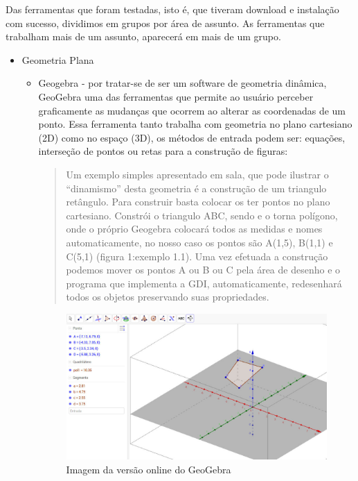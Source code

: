 \documentclass[12pt,a4paper]{article}
\begin{document}
Das ferramentas que foram testadas, isto é, que tiveram download e instalação com sucesso, dividimos em grupos por área de assunto. As ferramentas que trabalham mais de um assunto, aparecerá em mais de um grupo.
         \begin{itemize}
            \item Geometria Plana
            \begin{itemize}
                \item Geogebra - por tratar-se de ser um software de geometria dinâmica, GeoGebra uma das ferramentas que permite ao usuário perceber graficamente as mudanças que ocorrem ao alterar as coordenadas de um ponto. Essa ferramenta tanto trabalha com geometria no plano cartesiano (2D) como no espaço (3D), os métodos de entrada podem ser: equações, interseção de pontos ou retas para a construção de figuras:
                
\begin{quotation}
Um exemplo simples apresentado em sala, que pode ilustrar o “dinamismo” desta geometria é a construção de um triangulo retângulo. Para construir basta colocar os ter pontos no plano cartesiano. Constrói o triangulo ABC, sendo e o torna polígono, onde o próprio Geogebra colocará todos as medidas e nomes automaticamente, no nosso caso os pontos são A(1,5), B(1,1) e C(5,1) (figura 1:exemplo 1.1). Uma vez efetuada a construção podemos mover os pontos A ou B ou C pela área de desenho e o programa que implementa a GDI, automaticamente, redesenhará todos os objetos preservando suas propriedades.\end{quotation}

\begin{figure}[!h]
\centering
\includegraphics[scale=0.23]{imagens/geo.jpg} 
\caption{Imagem da versão online do GeoGebra}
\end{figure}


\end{itemize}
\end{itemize}
\end{document}
